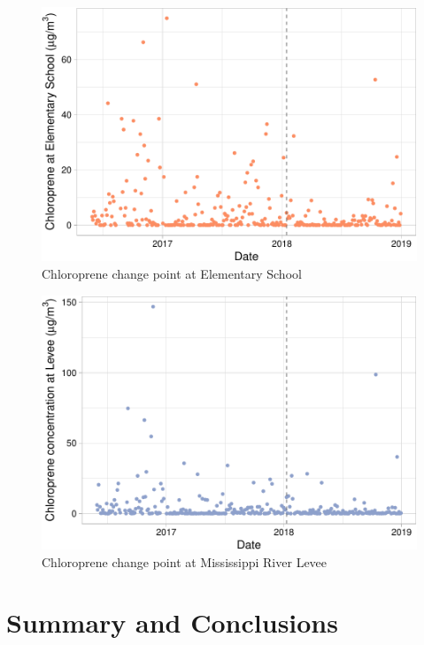 \documentclass[12pt,]{article}
\begin{document}
\begin{figure}
\centering
\includegraphics{Li_ENV872_Project_files/figure-latex/unnamed-chunk-10-1.pdf}
\caption{Chloroprene change point at Elementary School}
\end{figure}

\begin{figure}
\centering
\includegraphics{Li_ENV872_Project_files/figure-latex/unnamed-chunk-11-1.pdf}
\caption{Chloroprene change point at Mississippi River Levee}
\end{figure}

\newpage

\section{Summary and Conclusions}\label{summary-and-conclusions}
\end{document}
